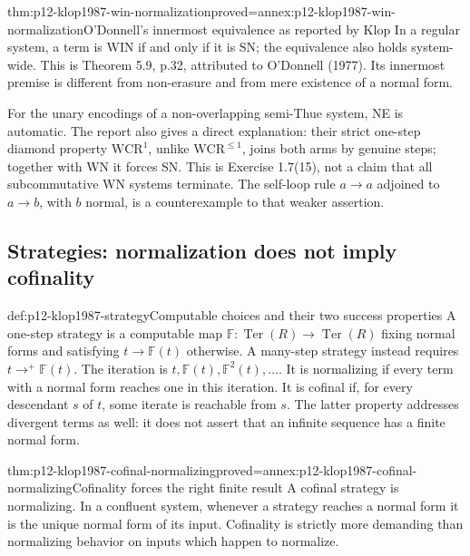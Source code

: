 \begin{hbtheorem}{thm:p12-klop1987-win-normalization}{proved=annex:p12-klop1987-win-normalization}{O'Donnell's innermost equivalence as reported by Klop}
In a regular system, a term is WIN if and only if it is SN; the
equivalence also holds system-wide. This is Theorem 5.9, p.32,
attributed to O'Donnell (1977). Its innermost premise is different from
non-erasure and from mere existence of a normal form.
\end{hbtheorem}

For the unary encodings of a non-overlapping semi-Thue system, NE is
automatic. The report also gives a direct explanation: their strict
one-step diamond property \(\mathrm{WCR}^{1}\), unlike
\(\mathrm{WCR}^{\leq1}\), joins both arms by genuine steps;
together with WN it forces SN. This is Exercise 1.7(15), not a claim that
all subcommutative WN systems terminate. The self-loop rule \(a\to a\)
adjoined to \(a\to b\), with \(b\) normal, is a counterexample
to that weaker assertion.

\subsection{Strategies: normalization does not imply cofinality}

\begin{hbdefinition}{def:p12-klop1987-strategy}{Computable choices and their two success properties}
A one-step strategy is a computable map
\(\mathbb F:\operatorname{Ter}(R)\to\operatorname{Ter}(R)\)
fixing normal forms and satisfying \(t\to\mathbb F(t)\) otherwise.
A many-step strategy instead requires \(t\to^+\mathbb F(t)\).
The iteration is \(t,\mathbb F(t),\mathbb F^2(t),\ldots\).
It is normalizing if every term with a normal form reaches one in this
iteration. It is cofinal if, for every descendant \(s\) of \(t\),
some iterate is reachable from \(s\).
The latter property addresses divergent terms as well: it does not assert
that an infinite sequence has a finite normal form.
\end{hbdefinition}

\begin{hbtheorem}{thm:p12-klop1987-cofinal-normalizing}{proved=annex:p12-klop1987-cofinal-normalizing}{Cofinality forces the right finite result}
A cofinal strategy is normalizing. In a confluent system, whenever a
strategy reaches a normal form it is the unique normal form of its input.
Cofinality is strictly more demanding than normalizing behavior on inputs
which happen to normalize.
\end{hbtheorem}

